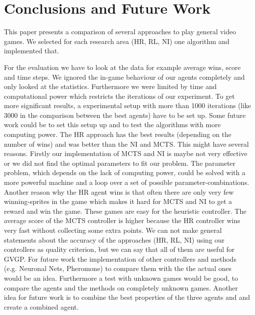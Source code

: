 \section{Conclusions and Future Work} 
\label{sec:conc}

This paper presents a comparison of several approaches to play general video games. We selected for each research area (\ac{HR}, \ac{RL}, \ac{NI})
one algorithm and implemented that. 


For the evaluation we have to look at the data for example average wins, score and time steps.
We ignored the in-game behaviour of our agents completely and only looked at the statistics. 
Furthermore we were limited by time and computational power which restricts the iterations of our experiment. 
To get more significant results, a experimental setup with more than 1000 iterations (like 3000 in the comparison between the best agents) have to be set up.
Some future work could be to set this setup up and to test the algorithms with more computing power.  
The \ac{HR} approach has the best results (depending on the number of wins) and was better than the \ac{NI} and \ac{MCTS}. This might have several reasons. Firstly our implementation of \ac{MCTS} and \ac{NI} is maybe not very effective or we did not find the optimal parameters to fit our problem. The parameter problem, which depends on the lack of computing power, could be solved with a more powerful machine and a loop over a set of possible parameter-combinations.
Another reason why the \ac{HR} agent wins is that often there are only very few winning-sprites in the game which makes it hard for \ac{MCTS} and \ac{NI} to get a reward and win the game. These games are easy for the heuristic controller. The average score of the \ac{MCTS} controller is higher because the \ac{HR} controller wins very fast without collecting some extra points. 
We can not make general statements about the accuracy of the approaches (\acs{HR}, \acs{RL}, \acs{NI}) using our controllers as quality criterion, but we can say that all of them are useful for \ac{GVGP}.
For future work the implementation of other controllers and methods (e.g. Neuronal Nets, Pheromone) to compare them with the the actual ones would be an idea. Furthermore a test with unknown games would be good, to compare the agents and the methods on completely unknown games.
Another idea for future work is to combine the best properties of the three agents and and create a combined agent.
